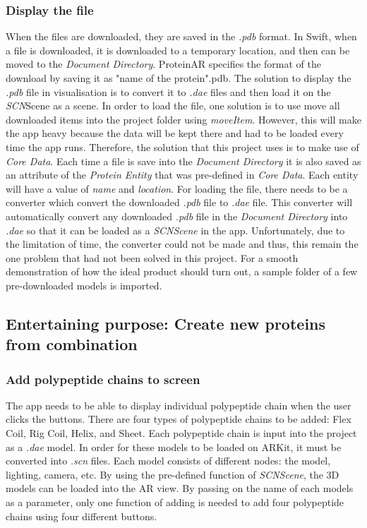 	\subsubsection{Display the file}
When the 	files are downloaded, they are saved in the \emph{.pdb} format. In Swift, when a file is downloaded, it is downloaded to a temporary location, and then can be moved to the \emph{Document Directory}. ProteinAR specifies the format of the download by saving it as "name of the protein".pdb. 
The solution to display the \emph{.pdb} file in visualisation is to convert it to \emph{.dae} files and then load it on the \emph{SCN}Scene as a scene. 
In order to load the file, one solution is to use move all downloaded items into the project folder using \emph{moveItem}. However, this will make the app heavy because the data will be kept there and had to be loaded every time the app runs. Therefore, the solution that this project uses is to make use of 
\emph{Core Data}. Each time a file is save into the \emph{Document Directory} it is also saved as an attribute of the \emph{Protein Entity} that was pre-defined in \emph{Core Data}. Each entity will have a value of \emph{name} and \emph{location}.
For loading the file, there needs to be a converter which convert the downloaded \emph{.pdb} file to \emph{.dae} file. This converter will automatically convert any downloaded \emph{.pdb} file in the \emph{Document Directory} into \emph{.dae} so that it can be loaded as a \emph{SCNScene} in the app. 
Unfortunately, due to the limitation of time, the converter could not be made and thus, this remain the one problem that had not been solved in this project. 
For a smooth demonstration of how the ideal product should turn out, a sample folder of a few pre-downloaded models is imported.

 	
\subsection{Entertaining purpose: Create new proteins from combination}
\subsubsection{Add polypeptide chains to screen}
The app needs to be able to display individual polypeptide chain when the user clicks the buttons. There are four types of polypeptide chains to be added: Flex Coil, Rig Coil, Helix, and Sheet. Each polypeptide chain is input into the project as a \emph{.dae} model. In order for these models to be loaded on ARKit, it must be converted into \emph{.scn} files. Each model consists of different nodes: the model, lighting, camera, etc. By using the pre-defined function of \emph{SCNScene}, the 3D models can be loaded into the AR view. By passing on the name of each models as a parameter, only one function of adding is needed to add four polypeptide chains using four different buttons. 

